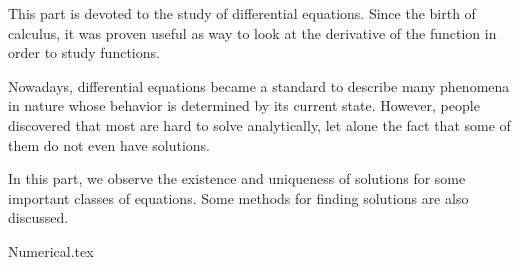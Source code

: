 \label{part:diffeq}

This part is devoted to the study of differential equations.
Since the birth of calculus,
it was proven useful as way to look at the derivative of the function
in order to study functions.

Nowadays, differential equations became a standard
to describe many phenomena in nature
whose behavior is determined by its current state.
However, people discovered that most are hard to solve analytically,
let alone the fact that some of them do not even have solutions.

In this part,
we observe the existence and uniqueness of solutions
for some important classes of equations.
Some methods for finding solutions are also discussed.

{Numerical.tex}